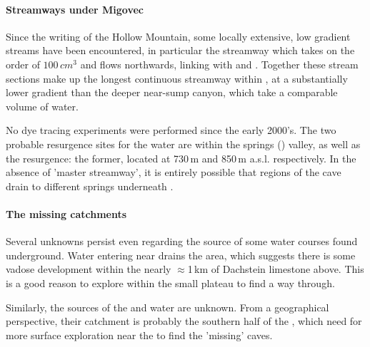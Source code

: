 \paragraph{Streamways under Migovec} Since the writing of the Hollow Mountain, some locally extensive, low gradient streams have been encountered, in particular the  streamway which takes on the order of $100\,cm^3$ and flows northwards, linking with  and . Together these stream sections make up the longest continuous streamway within , at a substantially lower gradient than the deeper near-sump canyon, which take a comparable volume of water. 
 


No dye tracing experiments were performed since the early 2000's. The two probable resurgence sites for the  water are within the  springs () valley, as well as the  resurgence: the former, located at 730\,m and 850\,m a.s.l. respectively. In the absence of 'master streamway', it is entirely possible that regions of the cave drain to different springs underneath . 

\paragraph{The missing catchments}
Several unknowns persist even regarding the source of some water courses found underground. Water entering near  drains the  area, which suggests there is some vadose development within the nearly $\approx$1\,km of Dachstein limestone above. This is a good reason to explore within the small  plateau to find a way through. 

Similarly, the sources of the  and  water are unknown. From a geographical perspective, their catchment is probably the southern half of the , which need for more surface exploration near the  to find the 'missing' caves. 




